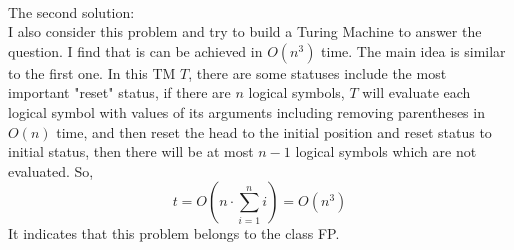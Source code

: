 \documentclass[a4papper]{article}
\theoremstyle{neosn}
\begin{document}
    \\ The second solution: \\

    I also consider this problem and try to build a Turing Machine to answer the question.
    I find that is can be achieved in $O(n^3)$ time.
    The main idea is similar to the first one. In this TM $T$, there are some statuses include the most important
    "reset" status, if there are $n$ logical symbols, $T$ will evaluate each logical symbol with values of
    its arguments including removing parentheses in $O(n)$ time, and then reset the head to the initial position
    and reset status to initial status, then there will be at most $n-1$ logical symbols which are not evaluated.
    So,
    \[
        t = O(n \cdot \sum_{i=1}^{n}i ) = O(n^3)
    \]
    It indicates that this problem belongs to the class FP.
\end{document}
